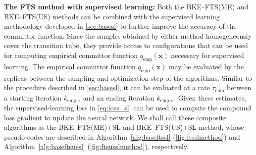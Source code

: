 \documentclass{article}
\numberwithin{equation}{section}
\def\*#1{\mathbf{#1}}
\theoremstyle{definition}
\theoremstyle{remark}
\begin{document}
\textbf{The FTS method with supervised learning:} Both the BKE--FTS(ME) and BKE--FTS(US) methods can be combined with the supervised learning methodology developed in \cref{sec:basesl} to further improve the accuracy of the committor function. 
Since the samples obtained by either method homogeneously cover the transition tube, they provide access to configurations that can be used for computing empirical committor function $q_\mathrm{emp}(\* x)$ necessary for supervised learning. The empirical committor function $q_\mathrm{emp}(\* x)$ may be evaluated by the replicas between the sampling and optimization step of the algorithms. 
Similar to the procedure described in \cref{sec:basesl}, it can be evaluated at a rate $ \tau_\mathrm{emp} $ between a starting iteration $ k_\mathrm{emp,s} $ and an ending iteration $ k_\mathrm{emp,e} $. 
Given these estimates, the supervised-learning loss in \cref{eq:loss_sl} can be used to compute the compound loss gradient to update the neural network. We shall call these composite algorithms as the BKE--FTS(ME)+SL and BKE--FTS(US)+SL method,  whose pseudo-codes are described in Algorithm~\ref{alg:baseftssl} (\cref{fig:ftsslmethod}) and Algorithm~\ref{alg:baseftsussl} (\cref{fig:ftsusslmethod}), respectively.
\end{document}
